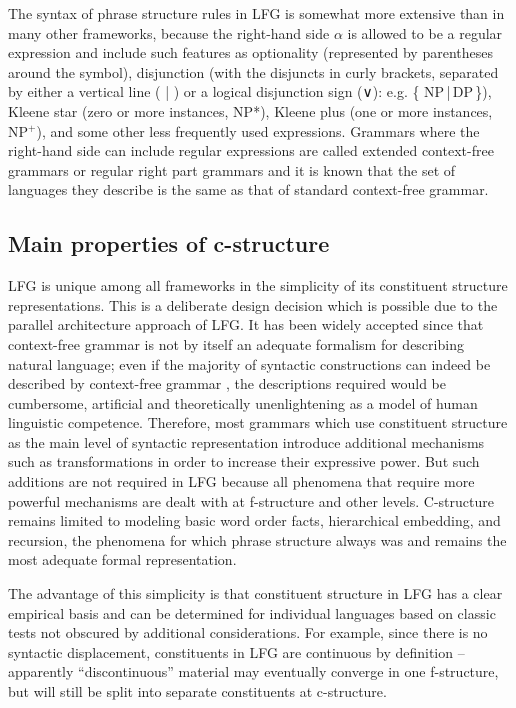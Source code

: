 \documentclass[output=paper]{langscibook}
\begin{document}
 The syntax of phrase structure rules in LFG is somewhat more extensive than in many other frameworks, because the right-hand side $\alpha$ is allowed to be a regular expression and include such features as optionality (represented by parentheses around the symbol), disjunction (with the disjuncts in curly brackets, separated by either a vertical line ( | ) or a logical disjunction sign (∨): e.g. \{ NP\,|\,DP\,\}), Kleene star (zero or more instances, NP*), Kleene plus (one or more instances, NP$^+$), and some other less frequently used expressions. Grammars where the right-hand side can include regular expressions are called extended context-free grammars or regular right part grammars and it is known \parencite{woods1970} that the set of languages they describe is the same as that of standard context-free grammar.
 
\subsection{Main properties of c-structure}
\largerpage[-1]
 LFG is unique among all frameworks in the simplicity of its constituent structure representations. This is a deliberate design decision which is possible due to the parallel architecture approach of LFG. It has been widely accepted since \textcite{chomsky1957syntactic} that context-free grammar is not by itself an adequate formalism for describing natural language; even if the majority of syntactic constructions can indeed be described by context-free grammar \parencite{pullum-gazdar1982}, the descriptions required would be cumbersome, artificial and theoretically unenlightening as a model of human linguistic competence. Therefore, most grammars which use constituent structure as the main level of syntactic representation introduce additional mechanisms such as transformations in order to increase their expressive power. But such additions are not required in LFG because all phenomena that require more powerful mechanisms are dealt with at f-structure and other levels. C-structure remains limited to modeling basic word order facts, hierarchical embedding, and recursion, the phenomena for which phrase structure always was and remains the most adequate formal representation.
 
 The advantage of this simplicity is that constituent structure in LFG has a clear empirical basis and can be determined for individual languages based on classic tests not obscured by additional considerations. For example, since there is no syntactic displacement, constituents in LFG are continuous by definition -- apparently ``discontinuous'' material may eventually converge in one f-structure, but will still be split into separate constituents at c-structure.
 
\end{document}
